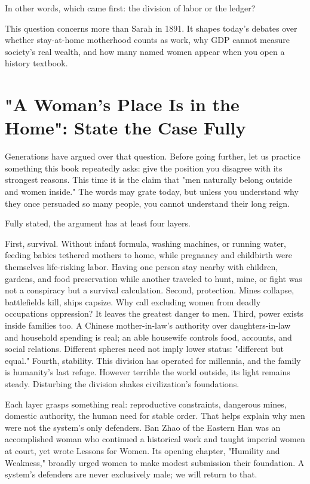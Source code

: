 In other words, which came first: the division of labor or the ledger?

This question concerns more than Sarah in 1891. It shapes today's debates over whether stay-at-home motherhood counts as work, why GDP cannot measure society's real wealth, and how many named women appear when you open a history textbook.

\section[The Case for a Woman's Place at Home]{"A Woman's Place Is in the Home": State the Case Fully}
Generations have argued over that question. Before going further, let us practice something this book repeatedly asks: give the position you disagree with its strongest reasons. This time it is the claim that "men naturally belong outside and women inside." The words may grate today, but unless you understand why they once persuaded so many people, you cannot understand their long reign.

Fully stated, the argument has at least four layers.

First, survival. Without infant formula, washing machines, or running water, feeding babies tethered mothers to home, while pregnancy and childbirth were themselves life-risking labor. Having one person stay nearby with children, gardens, and food preservation while another traveled to hunt, mine, or fight was not a conspiracy but a survival calculation. Second, protection. Mines collapse, battlefields kill, ships capsize. Why call excluding women from deadly occupations oppression? It leaves the greatest danger to men. Third, power exists inside families too. A Chinese mother-in-law's authority over daughters-in-law and household spending is real; an able housewife controls food, accounts, and social relations. Different spheres need not imply lower status: "different but equal." Fourth, stability. This division has operated for millennia, and the family is humanity's last refuge. However terrible the world outside, its light remains steady. Disturbing the division shakes civilization's foundations.

Each layer grasps something real: reproductive constraints, dangerous mines, domestic authority, the human need for stable order. That helps explain why men were not the system's only defenders. Ban Zhao of the Eastern Han was an accomplished woman who continued a historical work and taught imperial women at court, yet wrote Lessons for Women. Its opening chapter, "Humility and Weakness," broadly urged women to make modest submission their foundation. A system's defenders are never exclusively male; we will return to that.

